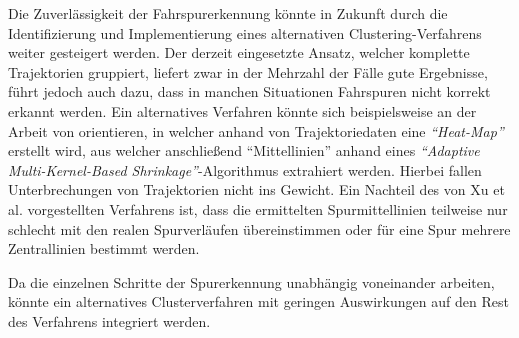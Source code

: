 Die Zuverlässigkeit der Fahrspurerkennung könnte in Zukunft durch die Identifizierung und Implementierung
eines alternativen Clustering-Verfahrens weiter gesteigert werden.
Der derzeit eingesetzte Ansatz, welcher komplette Trajektorien gruppiert, liefert zwar in der Mehrzahl der Fälle
gute Ergebnisse, führt jedoch auch dazu, dass in manchen Situationen Fahrspuren nicht korrekt erkannt werden.
Ein alternatives Verfahren könnte sich beispielsweise an der Arbeit von \cite[]{Xu2015} orientieren, in welcher
anhand von Trajektoriedaten eine \textit{``Heat-Map''} erstellt wird, aus welcher anschließend ``Mittellinien''
anhand eines \textit{``Adaptive Multi-Kernel-Based Shrinkage''}-Algorithmus extrahiert werden.
Hierbei fallen Unterbrechungen von Trajektorien nicht ins Gewicht. Ein Nachteil des von Xu et al. vorgestellten
Verfahrens ist, dass die ermittelten Spurmittellinien teilweise nur schlecht mit den realen Spurverläufen
übereinstimmen oder für eine Spur mehrere Zentrallinien bestimmt werden. 

Da die einzelnen Schritte der Spurerkennung unabhängig voneinander arbeiten, könnte ein
alternatives Clusterverfahren mit geringen Auswirkungen auf den Rest des Verfahrens integriert werden.